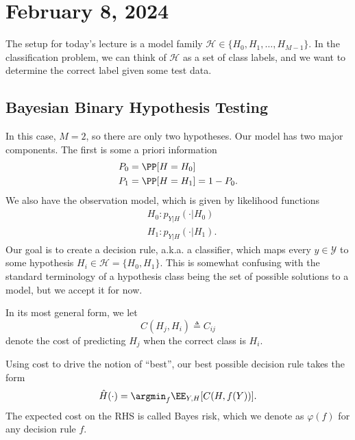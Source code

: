 \section{February 8, 2024}

The setup for today's lecture is a model family $\mathcal{H}\in \{H_0, H_1, \hdots, H_{M-1}\}$. In the classification problem, we can think of $\mathcal{H}$ as a set of class labels, and we want to determine the correct label given some test data. 

\subsection{Bayesian Binary Hypothesis Testing}

In this case, $M=2$, so there are only two hypotheses. Our model has two major components. The first is some a priori information 
\begin{align*}
	P_0 &= \PP[H=H_0] \\
	P_1 &= \PP[H=H_1] = 1 - P_0.
\end{align*}
We also have the observation model, which is given by likelihood functions
\begin{align*}
	&H_0: p_{Y|H}(\cdot | H_0) \\
	&H_1: p_{Y|H}(\cdot | H_1).
\end{align*}
Our goal is to create a \ac{decision rule}, a.k.a. a \ac{classifier}, which maps every $y\in \mathcal{Y}$ to some hypothesis $H_i\in \mathcal{H}=\{H_0, H_1\}$. This is somewhat confusing with the standard terminology of a hypothesis class being the set of possible solutions to a model, but we accept it for now.

\begin{definition}

In its most general form, we let
\[C(H_j, H_i)\triangleq C_{ij}\]
denote the cost of predicting $H_j$ when the correct class is $H_i$. 
\end{definition}

Using cost to drive the notion of ``best'', our best possible decision rule takes the form 
\[\hat{H}(\cdot) = \argmin_{f}\EE_{Y,H}[C(H,f(Y))].\] 
The expected cost on the RHS is called \ac{Bayes risk}, which we denote as $\varphi(f)$ for any decision rule $f$.

